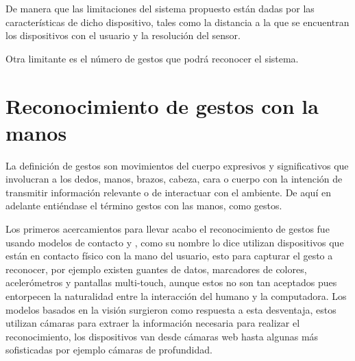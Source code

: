 De  manera que las limitaciones del sistema propuesto están dadas por las características de dicho dispositivo, tales como la distancia  a la que se encuentran los dispositivos con el usuario y la resolución del sensor. 

Otra limitante es el número de gestos que podrá reconocer el sistema.



\section{Reconocimiento de gestos con la manos}\label{sec:ReconocimientoGestos} 

La definición de gestos \citep{Mitra2007} son movimientos del cuerpo expresivos y significativos que involucran a los dedos, manos, brazos, cabeza, cara o cuerpo con la intención de transmitir información relevante o de interactuar con el ambiente. De aquí en adelante entiéndase el término gestos con las manos, como gestos. 

Los primeros acercamientos para llevar acabo el reconocimiento de gestos fue usando modelos de contacto \citep{Rautaray2012} y \citep{Nayakwadi2014}, como su nombre lo dice utilizan dispositivos que est\'an en contacto f\'isico con la mano del usuario, esto para capturar el gesto a reconocer, por ejemplo existen guantes de datos, marcadores de colores, acelerómetros y pantallas multi-touch, aunque estos no son tan aceptados pues entorpecen la naturalidad entre la interacción del humano y la computadora. Los modelos basados en la visión surgieron como respuesta a esta desventaja, estos utilizan cámaras para extraer la información necesaria para realizar el reconocimiento, los dispositivos van desde cámaras web hasta algunas más sofisticadas por ejemplo c\'amaras de profundidad.   

